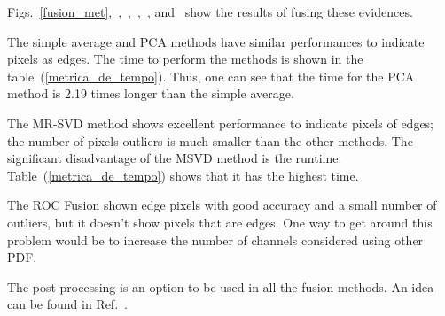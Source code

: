 \documentclass[journal]{IEEEtran}
\begin{document}
Figs.~\ref{fusion_met},~,~,~,~, and~ show the results of fusing these evidences. 

The simple average and PCA methods have similar performances to indicate pixels as edges. The time to perform the methods is shown in the table~(\ref{metrica_de_tempo}). Thus, one can see that the time for the PCA method is 2.19 times longer than the simple average.  

The MR-SVD method shows excellent performance to indicate pixels of edges; the number of pixels outliers is much smaller than the other methods. The significant disadvantage of the MSVD method is the runtime. Table~(\ref{metrica_de_tempo}) shows that it has the highest time.

The ROC Fusion shown edge pixels with good accuracy and a small number of outliers, but it doesn't show pixels that are edges. One way to get around this problem would be to increase the number of channels considered using other PDF.

The post-processing is an option to be used in all the fusion methods. An idea can be found in Ref.~\cite{gmbf}. 
\end{document}
